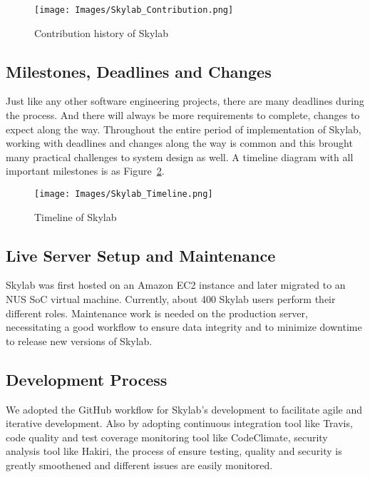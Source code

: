 \begin{figure}[h]
  \centering
  \texttt{[image: Images/Skylab\_Contribution.png]}
  \caption{Contribution history of Skylab}
  \label{fig:SkylabContribution}
\end{figure}

\subsection{Milestones, Deadlines and Changes}

Just like any other software engineering projects, there are many deadlines during the process. And there will always be more requirements to complete, changes to expect along the way. Throughout the entire period of implementation of Skylab, working with deadlines and changes along the way is common and this brought many practical challenges to system design as well. A timeline diagram with all important milestones is as Figure~\ref{fig:SkylabTimeline}.

\begin{figure}[h]
  \centering
  \texttt{[image: Images/Skylab\_Timeline.png]}
  \caption{Timeline of Skylab}
  \label{fig:SkylabTimeline}
\end{figure}

\subsection{Live Server Setup and Maintenance}

Skylab was first hosted on an Amazon EC2 instance and later migrated to an NUS SoC virtual machine. Currently, about 400 Skylab users perform their different roles.  Maintenance work is needed on the production server, necessitating a good workflow to ensure data integrity and to minimize downtime to release new versions of Skylab.

\subsection{Development Process}

We adopted the GitHub workflow for Skylab's development to facilitate agile and iterative development. Also by adopting continuous integration tool like Travis, code quality and test coverage monitoring tool like CodeClimate, security analysis tool like Hakiri, the process of ensure testing, quality and security is greatly smoothened and different issues are easily monitored.

